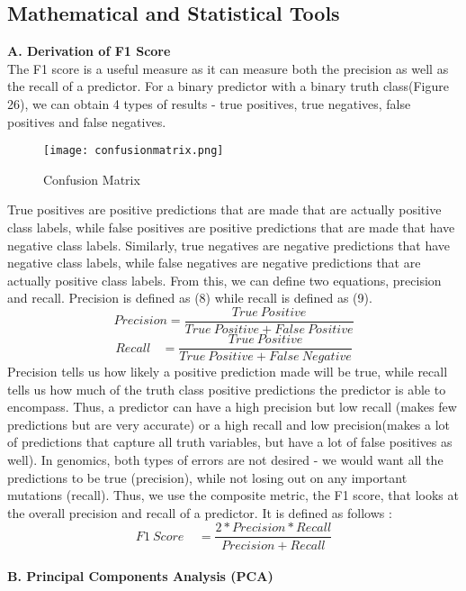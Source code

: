 \documentclass{article}
\begin{document}
\subsection{Mathematical and Statistical Tools}
\textbf{A. Derivation of F1 Score}\\
The F1 score is a useful measure as it can measure both the precision as well as the recall of a predictor. For a binary predictor with a binary truth class(Figure 26), we can obtain 4 types of results - true positives, true negatives, false positives and false negatives. 
\begin{figure}[H]
\texttt{[image: confusionmatrix.png]}
\caption{Confusion Matrix}
\centering
\end{figure}
True positives are positive predictions that are made that are actually positive class labels, while false positives are positive predictions that are made that have negative class labels. Similarly, true negatives are negative predictions that have negative class labels, while false negatives are negative predictions that are actually positive class labels. From this, we can define two equations, precision and recall. Precision is defined as (8) while recall is defined as (9). 
\begin{equation}
Precision = \frac{True \ Positive}{True\  Positive + False \ Positive} 
\end{equation}
\begin{equation}
Recall\ \ \ \ = \frac{True\ Positive}{True \ Positive + False \ Negative} 
\end{equation}
Precision tells us how likely a positive prediction made will be true, while recall tells us how much of the truth class positive predictions the predictor is able to encompass. Thus, a predictor can have a high precision but low recall (makes few predictions but are very accurate) or a high recall and low precision(makes a lot of predictions that capture all truth variables, but have a lot of false positives as well). In genomics, both types of errors are not desired - we would want all the predictions to be true (precision), while not losing out on any important mutations (recall). Thus, we use the composite metric, the F1 score, that looks at the overall precision and recall of a predictor. It is defined as follows :
\begin{equation}
{F1} \ Score \ \ \  \ \ = \frac{2*Precision*Recall}{Precision + Recall} 
\end{equation}
\\
\textbf{B. Principal Components Analysis (PCA)}\\
\end{document}

